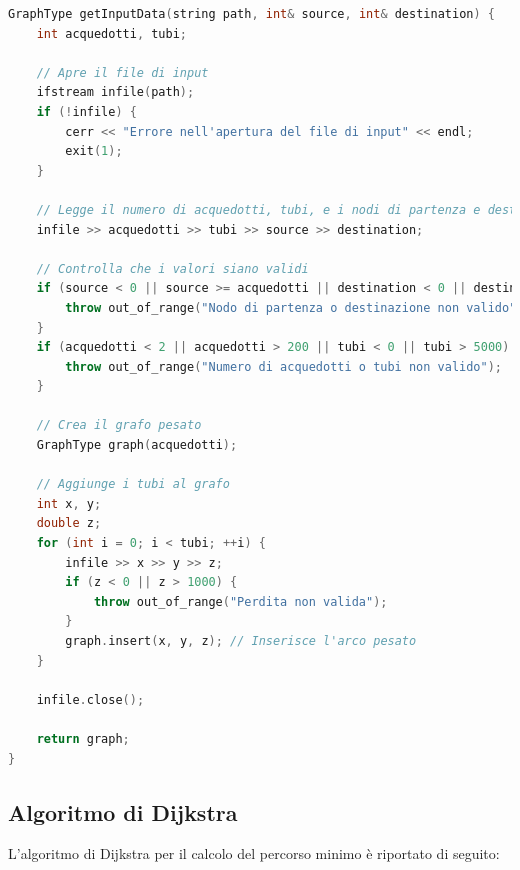 \documentclass[a4paper,12pt]{article}
\begin{document}
\clearpage

\begin{lstlisting}[language=c++, label=getInputData]
GraphType getInputData(string path, int& source, int& destination) {
    int acquedotti, tubi;

    // Apre il file di input
    ifstream infile(path); 
    if (!infile) {
        cerr << "Errore nell'apertura del file di input" << endl;
        exit(1);
    }

    // Legge il numero di acquedotti, tubi, e i nodi di partenza e destinazione
    infile >> acquedotti >> tubi >> source >> destination;

    // Controlla che i valori siano validi
    if (source < 0 || source >= acquedotti || destination < 0 || destination >= acquedotti) {
        throw out_of_range("Nodo di partenza o destinazione non valido");
    }
    if (acquedotti < 2 || acquedotti > 200 || tubi < 0 || tubi > 5000) {
        throw out_of_range("Numero di acquedotti o tubi non valido");
    }

    // Crea il grafo pesato
    GraphType graph(acquedotti);

    // Aggiunge i tubi al grafo
    int x, y;
    double z;
    for (int i = 0; i < tubi; ++i) {
        infile >> x >> y >> z;
        if (z < 0 || z > 1000) {
            throw out_of_range("Perdita non valida");
        }
        graph.insert(x, y, z); // Inserisce l'arco pesato
    }

    infile.close();

    return graph;
}
\end{lstlisting}

\clearpage

\subsection{Algoritmo di Dijkstra}

L'algoritmo di Dijkstra per il calcolo del percorso minimo è riportato di seguito:  
\end{document}
